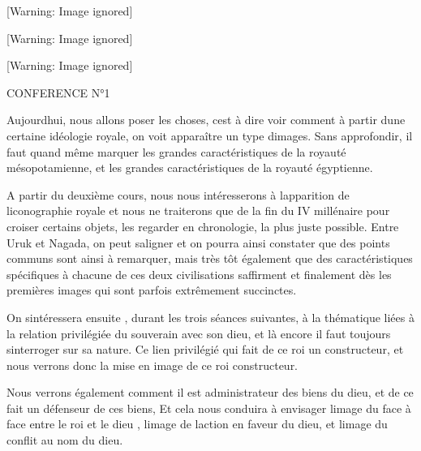 \documentclass{article}
\begin{document}
\begin{center}
 [Warning: Image ignored] %

\end{center}
\begin{center}
 [Warning: Image ignored] %

\end{center}
\begin{center}
 [Warning: Image ignored] %

\end{center}
CONFERENCE N°1  

Aujourd{\textquotesingle}hui, nous allons poser les choses,
c{\textquotesingle}est à dire voir comment à partir
d{\textquotesingle}une certaine idéologie royale, on voit apparaître un
type d{\textquotesingle}images. Sans approfondir,  il faut quand même
marquer les grandes caractéristiques de la royauté mésopotamienne, et
les grandes caractéristiques de la royauté égyptienne.

A partir du deuxième cours, nous nous intéresserons à
l{\textquotesingle}apparition de l{\textquotesingle}iconographie royale
et nous ne traiterons que de la fin du IV millénaire pour croiser
certains objets, les regarder en chronologie, la plus juste possible.
Entre Uruk et Nagada, on peut s{\textquotesingle}aligner et on pourra
ainsi constater que des points communs sont ainsi à remarquer, mais
très tôt également que des caractéristiques spécifiques à chacune de
ces deux civilisations s{\textquotesingle}affirment et finalement dès
les premières images qui sont parfois extrêmement succinctes.

On s{\textquotesingle}intéressera ensuite , durant les trois séances
suivantes,  à la thématique liées à la relation privilégiée du
souverain avec son dieu, et là encore il faut toujours
s{\textquotesingle}interroger sur sa nature. Ce lien privilégié qui
fait de ce roi un constructeur, et nous verrons donc la mise en image
de ce roi constructeur.

Nous verrons également comment il est administrateur des biens du dieu,
et de ce fait un défenseur de ces biens,  Et cela nous conduira  à
envisager l{\textquotesingle}image du face à face entre le roi et le
dieu , l{\textquotesingle}image de l{\textquotesingle}action en faveur
du dieu, et l{\textquotesingle}image du conflit au nom du dieu.
\end{document}
